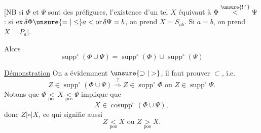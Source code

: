 [NB si $\Phi$ et $\Psi$ sont des préfigures, l'existence d'un tel $X$ équivaut à $\Phi\overset{\unsure{!|'}}{<}\Psi$ : si $\operatorname{ex}\delta\Phi\unsure{=|\leq}a<\operatorname{or}\delta\Psi=b$, on prend $X=S_{ab}$. Si $a=b$, on prend $X=P_a$].

Alors
\[
\operatorname{supp}^{\circ}(\Phi\cup\Psi)=\operatorname{supp}^{\circ}(\Phi)\cup\operatorname{supp}^{\circ}(\Psi)
\]

\uline{Démonstration} On a évidemment $\unsure{\supset|>}$, il faut prouver $\subset$, i.e.
\[
Z\in\operatorname{supp}^{\circ}(\Phi\cup\Psi)\overset{?}{\Longrightarrow}Z\in\operatorname{supp}^{\circ}\Phi\text{ ou }Z\in\operatorname{supp}^{\circ}\Psi.
\]
 Notons que $\Phi\underset{\mathrm{pos}}{<}X\underset{\mathrm{pos}}{<}\Psi$ implique que
\[
X\in\operatorname{cosupp}^{\circ}(\Phi\cup\Psi),
\]
donc $Z\mathrel{|\circ|}X$, ce qui signifie aussi
\[
Z\underset{\mathrm{pos}}{<}X\text{ ou }Z\underset{\mathrm{pos}}{>}X.
\]

